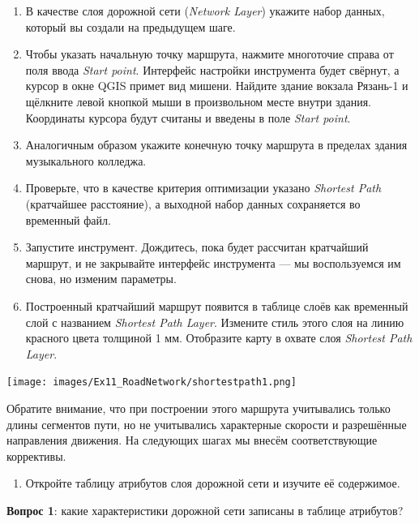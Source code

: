 \documentclass[
  12pt,
]{book}
\providecommand{\tightlist}{%
  \setlength{\itemsep}{0pt}\setlength{\parskip}{0pt}}
\begin{document}
\begin{enumerate}
\def\labelenumi{\arabic{enumi}.}
\setcounter{enumi}{4}
\item
  В качестве слоя дорожной сети (\emph{Network Layer}) укажите набор данных, который вы создали на предыдущем шаге.
\item
  Чтобы указать начальную точку маршрута, нажмите многоточие справа от поля ввода \emph{Start point}. Интерфейс настройки инструмента будет свёрнут, а курсор в окне QGIS примет вид мишени. Найдите здание вокзала Рязань-1 и щёлкните левой кнопкой мыши в произвольном месте внутри здания. Координаты курсора будут считаны и введены в поле \emph{Start point}.
\item
  Аналогичным образом укажите конечную точку маршрута в пределах здания музыкального колледжа.
\item
  Проверьте, что в качестве критерия оптимизации указано \emph{Shortest Path} (кратчайшее расстояние), а выходной набор данных сохраняется во временный файл.
\item
  Запустите инструмент. Дождитесь, пока будет рассчитан кратчайший маршрут, и не закрывайте интерфейс инструмента --- мы воспользуемся им снова, но изменим параметры.
\item
  Построенный кратчайший маршрут появится в таблице слоёв как временный слой с названием \emph{Shortest Path Layer}. Измените стиль этого слоя на линию красного цвета толщиной 1 мм. Отобразите карту в охвате слоя \emph{Shortest Path Layer}.
\end{enumerate}

\texttt{[image: images/Ex11\_RoadNetwork/shortestpath1.png]}

Обратите внимание, что при построении этого маршрута учитывались только длины сегментов пути, но не учитывались характерные скорости и разрешённые направления движения. На следующих шагах мы внесём соответствующие коррективы.

\begin{enumerate}
\def\labelenumi{\arabic{enumi}.}
\setcounter{enumi}{10}
\tightlist
\item
  Откройте таблицу атрибутов слоя дорожной сети и изучите её содержимое.
\end{enumerate}

\textbf{Вопрос 1}: какие характеристики дорожной сети записаны в таблице атрибутов?
\end{document}
